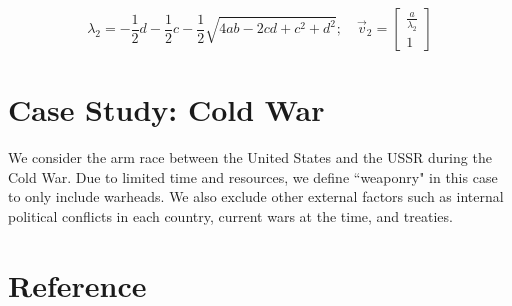 $$\lambda_2 = -\frac{1}{2}d - \frac{1}{2}c - \frac{1}{2}\sqrt{4ab -2cd + c^2 + d^2}; \quad \vec{v}_2 = 
\begin{bmatrix}
	\frac{a}{\lambda_2}\\
	1
\end{bmatrix} $$

\section{Case Study: Cold War}
We consider the arm race between the United States and the USSR during the Cold War. Due to limited time and resources, we define ``weaponry" in this case to only include warheads. We also exclude other external factors such as internal political conflicts in each country, current wars at the time, and treaties.


\section{Reference}


